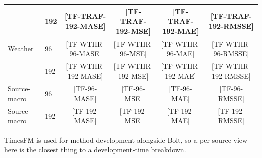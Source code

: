 \documentclass{article}
\newcommand{\ph}[1]{\textcolor{phgray}{\textsf{[#1]}}}
\begin{document}
\begin{table}[h]
{\begin{tabular}{llcccc}
     & 192 & \ph{TF-TRAF-192-MASE} & \ph{TF-TRAF-192-MSE} & \ph{TF-TRAF-192-MAE} & \ph{TF-TRAF-192-RMSSE} \\
    \midrule
    Weather & 96 & \ph{TF-WTHR-96-MASE} & \ph{TF-WTHR-96-MSE} & \ph{TF-WTHR-96-MAE} & \ph{TF-WTHR-96-RMSSE} \\
     & 192 & \ph{TF-WTHR-192-MASE} & \ph{TF-WTHR-192-MSE} & \ph{TF-WTHR-192-MAE} & \ph{TF-WTHR-192-RMSSE} \\
    \midrule
    \rowcolor{bestgray}Source-macro & 96  & \ph{TF-96-MASE} & \ph{TF-96-MSE} & \ph{TF-96-MAE} & \ph{TF-96-RMSSE} \\
    \rowcolor{bestgray}Source-macro & 192 & \ph{TF-192-MASE} & \ph{TF-192-MSE} & \ph{TF-192-MAE} & \ph{TF-192-RMSSE} \\
    \bottomrule
  \end{tabular}}
\end{table}

TimesFM is used for method development alongside Bolt, so a per-source view here is the closest thing to a development-time breakdown.
\end{document}
